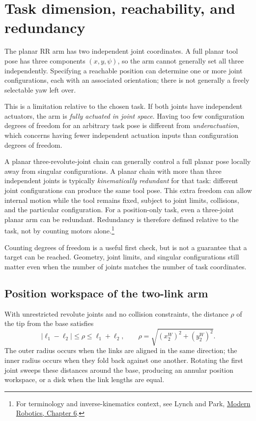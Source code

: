 \section{Task dimension, reachability, and redundancy}
The planar RR arm has two independent joint coordinates. A full planar
tool pose has three components $(x,y,\psi)$, so the arm cannot generally
set all three independently. Specifying a reachable position can determine
one or more joint configurations, each with an associated orientation;
there is not generally a freely selectable yaw left over.

This is a limitation relative to the chosen task. If both joints have
independent actuators, the arm is \emph{fully actuated in joint space}.
Having too few configuration degrees of freedom for an arbitrary task
pose is different from \emph{underactuation}, which concerns having fewer
independent actuation inputs than configuration degrees of freedom.

A planar three-revolute-joint chain can generally control a full planar
pose locally away from singular configurations. A planar chain with more
than three independent joints is typically \emph{kinematically redundant}
for that task: different joint configurations can produce the same tool
pose. This extra freedom can allow internal motion while the tool remains
fixed, subject to joint limits, collisions, and the particular configuration.
For a position-only task, even a three-joint planar arm can be redundant.
Redundancy is therefore defined relative to the task, not by counting
motors alone.\footnote{For terminology and inverse-kinematics context, see
Lynch and Park, \href{https://modernrobotics.northwestern.edu/nu-gm-book-resource/inverse-kinematics-of-open-chains/}{Modern Robotics, Chapter 6}.}

Counting degrees of freedom is a useful first check, but is not a guarantee
that a target can be reached. Geometry, joint limits, and singular
configurations still matter even when the number of joints matches the
number of task coordinates.

\subsection{Position workspace of the two-link arm}
With unrestricted revolute joints and no collision constraints, the
distance $\rho$ of the tip from the base satisfies
\begin{equation}
 |\ell_1-\ell_2|\le\rho\le\ell_1+\ell_2,
 \qquad\rho=\sqrt{(x_2^W)^2+(y_2^W)^2}.
 \label{eq:l10-workspace}
\end{equation}
The outer radius occurs when the links are aligned in the same direction;
the inner radius occurs when they fold back against one another. Rotating
the first joint sweeps these distances around the base, producing an
annular position workspace, or a disk when the link lengths are equal.

